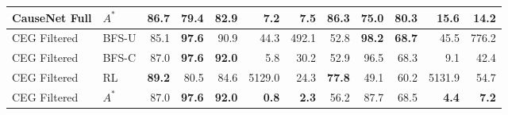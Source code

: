 \begin{table}[t]
{\begin{tabular}{@{}llrrrrr@{\hspace{8pt}}rrrrr@{}}
CauseNet Full & $A^*$
& 86.7 & 79.4 & 82.9 & {\bfseries 7.2} & {\bfseries 7.5}
& 86.3 & 75.0 & 80.3 & {\bfseries 15.6} & {\bfseries 14.2} \\
\midrule
CEG Filtered & BFS-U
& 85.1 & {\bfseries 97.6} & 90.9 & 44.3 & 492.1
& 52.8 & {\bfseries 98.2} & {\bfseries 68.7} & 45.5 & 776.2 \\
CEG Filtered & BFS-C
& 87.0 & {\bfseries 97.6} & {\bfseries 92.0} & 5.8 & 30.2
& 52.9 & 96.5 & 68.3 & 9.1 & 42.4 \\
CEG Filtered & RL
& {\bfseries 89.2} & 80.5 & 84.6 & 5129.0 & 24.3
& {\bfseries 77.8} & 49.1 & 60.2 & 5131.9 & 54.7 \\
CEG Filtered & $A^*$
& 87.0 & {\bfseries 97.6} & {\bfseries 92.0} & {\bfseries 0.8} & {\bfseries 2.3}
& 56.2 & 87.7 & 68.5 & {\bfseries 4.4} & {\bfseries 7.2} \\
\bottomrule
\end{tabular}%
}
\end{table}
